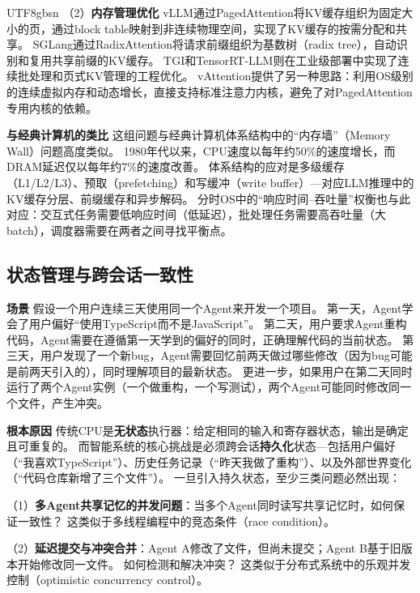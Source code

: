 \documentclass[11pt,a4paper]{article}
\begin{document}
\begin{CJK*}{UTF8}{gbsn}
（2）\textbf{内存管理优化}
vLLM\cite{kwon2023pagedattention,vllm_docs_2026}通过PagedAttention将KV缓存组织为固定大小的页，通过block table映射到非连续物理空间，实现了KV缓存的按需分配和共享。
SGLang\cite{sglang2024,sglang_docs_2026}通过RadixAttention将请求前缀组织为基数树（radix tree），自动识别和复用共享前缀的KV缓存。
TGI\cite{tgi_docs_2026}和TensorRT-LLM\cite{tensorrtllm_docs_2026}则在工业级部署中实现了连续批处理和页式KV管理的工程优化。
vAttention\cite{prabhu2024vattention}提供了另一种思路：利用OS级别的连续虚拟内存和动态增长，直接支持标准注意力内核，避免了对PagedAttention专用内核的依赖。

\textbf{与经典计算机的类比}
这组问题与经典计算机体系结构中的``内存墙''（Memory Wall）问题高度类似。
1980年代以来，CPU速度以每年约50\%的速度增长，而DRAM延迟仅以每年约7\%的速度改善\cite{hennessy2017quantitative}。
体系结构的应对是多级缓存（L1/L2/L3）、预取（prefetching）和写缓冲（write buffer）---对应LLM推理中的KV缓存分层、前缀缓存和异步解码。
分时OS中的``响应时间--吞吐量''权衡也与此对应：交互式任务需要低响应时间（低延迟），批处理任务需要高吞吐量（大batch），调度器需要在两者之间寻找平衡点\cite{ostep_2023}。

\subsection{状态管理与跨会话一致性}

\textbf{场景}
假设一个用户连续三天使用同一个Agent来开发一个项目。
第一天，Agent学会了用户偏好``使用TypeScript而不是JavaScript''。
第二天，用户要求Agent重构代码，Agent需要在遵循第一天学到的偏好的同时，正确理解代码的当前状态。
第三天，用户发现了一个新bug，Agent需要回忆前两天做过哪些修改（因为bug可能是前两天引入的），同时理解项目的最新状态。
更进一步，如果用户在第二天同时运行了两个Agent实例（一个做重构，一个写测试），两个Agent可能同时修改同一个文件，产生冲突。

\textbf{根本原因}
传统CPU是\textbf{无状态}执行器：给定相同的输入和寄存器状态，输出是确定且可重复的。
而智能系统的核心挑战是必须跨会话\textbf{持久化}状态---包括用户偏好（``我喜欢TypeScript''）、历史任务记录（``昨天我做了重构''）、以及外部世界变化（``代码仓库新增了三个文件''）。
一旦引入持久状态，至少三类问题必然出现：

（1）\textbf{多Agent共享记忆的并发问题}：当多个Agent同时读写共享记忆时，如何保证一致性？
这类似于多线程编程中的竞态条件（race condition）。

（2）\textbf{延迟提交与冲突合并}：Agent A修改了文件，但尚未提交；Agent B基于旧版本开始修改同一文件。
如何检测和解决冲突？
这类似于分布式系统中的乐观并发控制（optimistic concurrency control）。


\end{CJK*}
\end{document}
